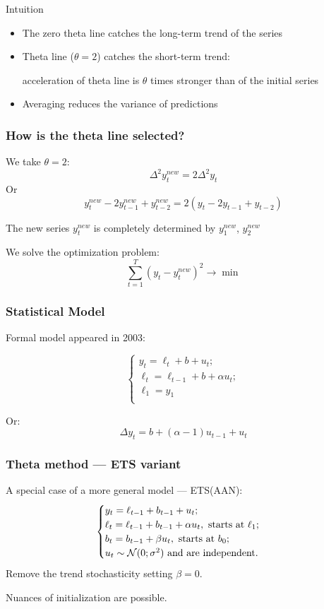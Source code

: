 \begin{frame}{Intuition}
	
	\begin{itemize}[<+->]
		\item The zero theta line catches the long-term trend of the series
		\item Theta line ($\theta=2$) catches the short-term trend:
		
		\alert{acceleration} of theta line is $\theta$ times stronger
		than  of the initial series
		
		
		\item Averaging reduces the variance of predictions
	\end{itemize}
\end{frame}



\begin{frame}
	\frametitle{How is the theta line selected?}
	
	We take $\theta = 2$:
	\[
	\Delta^2 y^{new}_t = 2 \Delta^2 y_t
	\]
	\pause
	Or
	\[
	y^{new}_t - 2 y^{new}_{t-1} + y^{new}_{t-2} = 2(y_t - 2 y_{t-1} + y_{t-2} )
	\]
	
	\pause
	The new series $y^{new}_t$ is completely determined by $y_1^{new}$, $y_{2}^{new}$
	
	\pause
	We solve the optimization problem:
	\[
	\sum_{t=1}^T (y_t - y_t^{new})^2 \to \min
	\]
\end{frame}


\begin{frame}
	\frametitle{Statistical Model}
	
	Formal model appeared in 2003:
	
	\[
	\begin{cases}
		y_t = \ell_t + b + u_t; \\
		\ell_t = \ell_{t-1} + b + \alpha u_t; \\
		\ell_1 = y_1 \\
	\end{cases}
	\]
	
	\pause
	Or:
	\[
	\Delta y_t = b + (\alpha - 1) u_{t-1} + u_t
	\]
\end{frame}

\begin{frame}
	\frametitle{Theta method — ETS variant}
	
	A special case of a more general model — ETS(AAN):
	\[
	\begin{cases}
		y_t = \ell_{t-1} + b_{t-1} + u_t; \\
		\ell_t = \ell_{t-1} + b_{t-1} + \alpha u_t, \text{ starts at } \ell_1; \\
		b_t = b_{t-1} + \beta u_t, \text{ starts at } b_0; \\
		u_t \sim \mathcal{N}(0;\sigma^2) \text{ and are independent.} \\
	\end{cases}
	\]
	\pause
	Remove the trend stochasticity setting $\beta = 0$.
	
	\pause
	\alert{Nuances} of initialization are possible.
\end{frame}




